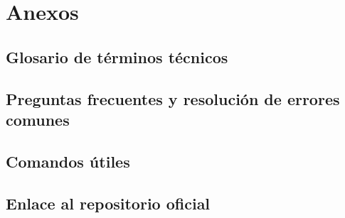 \chapter{Anexos}
\section{Glosario de t\'erminos t\'ecnicos}
\section{Preguntas frecuentes y resoluci\'on de errores comunes}
\section{Comandos \'utiles}
\section{Enlace al repositorio oficial}
